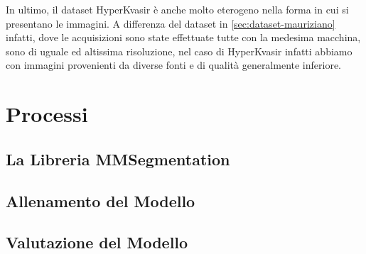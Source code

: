 In ultimo, il dataset HyperKvasir è anche molto eterogeno
nella forma in cui si presentano le immagini.
A differenza del dataset in \ref{sec:dataset-mauriziano} infatti,
dove le acquisizioni sono state effettuate tutte con la medesima
macchina, sono di uguale ed altissima risoluzione, nel caso
di HyperKvasir infatti abbiamo con immagini provenienti da diverse
fonti e di qualità generalmente inferiore.


\section{Processi}
\subsection{La Libreria MMSegmentation}
\subsection{Allenamento del Modello}
\subsection{Valutazione del Modello}